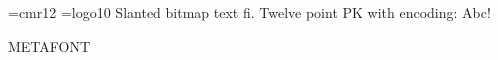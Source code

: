  
\font\twelve=cmr12 \font\logo=logo10
\tensl Slanted bitmap text fi. \twelve Twelve point PK with encoding: Abc!
\par\logo METAFONT
\bye
